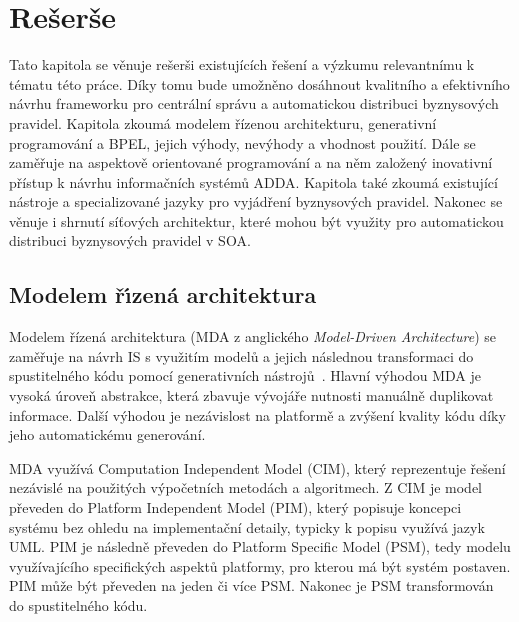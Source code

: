 
\chapter{Rešerše}\label{ch:reserse}

Tato kapitola se věnuje rešerši existujících řešení
a výzkumu relevantnímu k tématu této práce. Díky tomu bude umožněno
dosáhnout kvalitního a efektivního návrhu frameworku pro centrální správu a automatickou
distribuci byznysových pravidel.
Kapitola zkoumá modelem řízenou architekturu, generativní
programování a BPEL, jejich výhody, nevýhody a vhodnost použití.
Dále se zaměřuje na aspektově orientované programování
a na něm založený inovativní přístup k návrhu informačních systémů \gls{ADDA}.
Kapitola také zkoumá existující nástroje a specializované jazyky pro vyjádření
byznysových pravidel.
Nakonec se věnuje i shrnutí síťových architektur, které mohou být využity
pro automatickou distribuci byznysových pravidel v \gls{SOA}.

\section{Modelem ř\'{\i}zená architektura}

Modelem řízená architektura (\gls{MDA} z anglického \textit{Model-Driven
Architecture}) se zaměřuje na návrh \gls{IS} s využitím modelů a jejich
následnou transformaci do spustitelného kódu pomocí generativních nástrojů~\cite{soley2000model}.
Hlavní výhodou \gls{MDA} je vysoká úroveň abstrakce, která zbavuje vývojáře nutnosti
manuálně duplikovat informace. Další výhodou je nezávislost na platformě a zvýšení
kvality kódu díky jeho automatickému generování.


\gls{MDA} využívá Computation Independent Model (\gls{CIM}), který reprezentuje
řešení nezávislé na použitých výpočetních metodách a algoritmech. Z \gls{CIM} je
model převeden do Platform Independent Model (\gls{PIM}),
který popisuje koncepci systému bez ohledu na implementační detaily, typicky k popisu
využívá jazyk \gls{UML}. \gls{PIM} je následně převeden do
Platform Specific Model (\gls{PSM}), tedy modelu využívajícího
specifických aspektů platformy, pro kterou má být systém postaven.
\gls{PIM} může být převeden na jeden či více \gls{PSM}.
Nakonec je \gls{PSM} transformován do spustitelného kódu.

